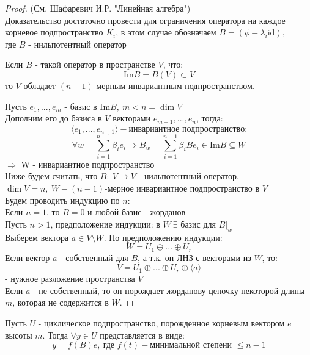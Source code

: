     \begin{proof} (См. Шафаревич И.Р. "Линейная алгебра")\\
        Доказательство достаточно провести для ограничения оператора на каждое корневое подпространство $K_i$, в этом случае обозначаем $B = (\phi - \lambda_i \text{id})$,\\ 
        где $B$ - нильпотентный оператор
        \begin{lemma}
            Если $B$ - такой оператор в пространстве $V$, что: 
            $$\text{Im}B = B(V) \subset V$$
            то $V$ обладает $(n-1)$-мерным инвариантным подпространством.     
        \end{lemma} 
        Пусть $e_1,...,e_m$ - базис в $\text{Im}B, \ m<n = \dim V$\\
        Дополним его до базиса в $V$ векторами $e_{m+1},...,e_n$, тогда:
        $$\langle e_1,...,e_{n-1} \rangle - \text{инвариантное подпространство:}$$
        $$\forall w = \sum \limits_{i=1}^{n-1}\beta_ie_i \Longrightarrow B_w = \sum \limits_{i=1}^{n-1}\beta_iBe_i \in \text{Im}B \subseteq W$$ 
        $\Longrightarrow $ W - инвариантное подпространство\\
        Ниже будем считать, что $B: \ V \to V$ - нильпотентный оператор, \\
        $\dim V = n, \ W - (n-1)$-мерное инвариантное подпространство в $V$\\
        Будем проводить индукцию по $n$:\\
        Если $n=1$, то $B = 0$ и любой базис - жорданов\\
        Пусть $n>1$, предположение индукции: в $W \ \exists$ базис для $B|_w$\\
        Выберем вектора $a \in V\setminus W$. По предположению индукции:
        $$W = U_1 \oplus ... \oplus U_r$$
        Если вектор $a$ - собственный для $B$, а т.к. он ЛНЗ с векторами из $W$, то: 
        $$V = U_1 \oplus ... \oplus U_r \oplus \langle a \rangle$$ 
        - нужное разложение пространства $V$\\
        Если $a$ - не собственный, то он порождает жорданову цепочку некоторой длины $m$, которая не содержится в $W$.          
    \end{proof}
    \begin{lemma}
        Пусть $U$ - циклическое подпространство, порожденное корневым вектором $e$ высоты $m$. Тогда $\forall y \in U$ представляется в виде:
        $$y = f(B)e, \ \text{где } f(t) - \text{минимальной степени } \leq n-1$$     
    \end{lemma}
